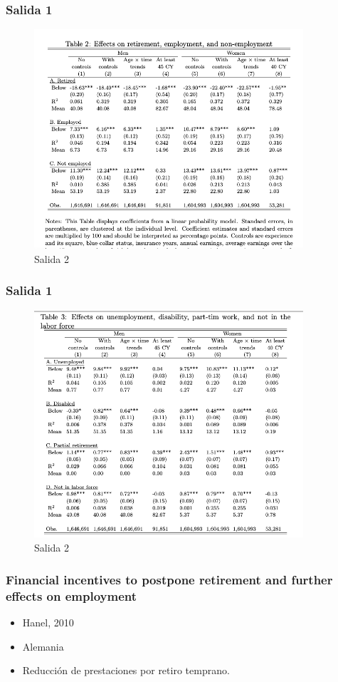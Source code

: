 \documentclass{beamer}
\begin{document}
  {
    \frametitle{Salida 1}
      \begin{figure}[htp]
        \centering
        \includegraphics[width=10cm]{imgs/staubli-tab2}
        \caption{Salida 2}
        \label{fig:fig2}
      \end{figure}
  }
  \frame
  {
    \frametitle{Salida 1}
      \begin{figure}[htp]
        \centering
        \includegraphics[width=10cm]{imgs/staubli-tab3}
        \caption{Salida 2}
        \label{fig:fig2}
      \end{figure}
  }
  \frame
  {
    \frametitle{Financial incentives to postpone retirement and further effects on employment}
    \begin{itemize}
    \item Hanel, 2010
    \item Alemania
    \item Reducción de prestaciones por retiro temprano.
    \end{itemize}
  }
\end{document}
